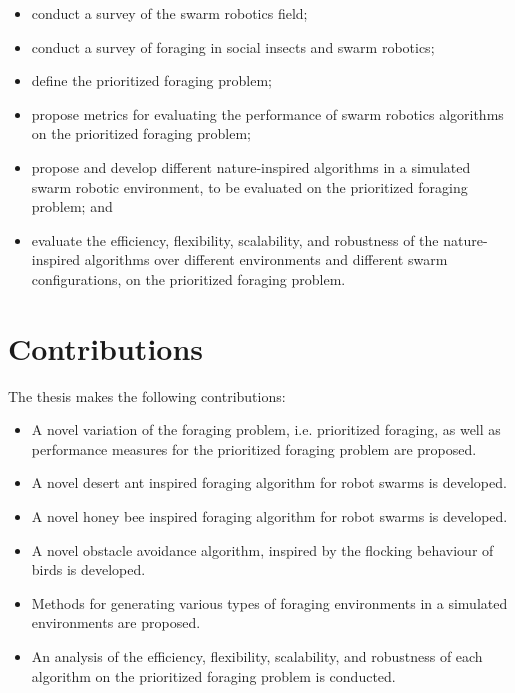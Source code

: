\begin{itemize}
	\item conduct a survey of the swarm robotics field;
	\item conduct a survey of foraging in social insects and  swarm robotics;
	\item define the prioritized foraging problem;
	\item propose metrics for evaluating the performance of swarm robotics algorithms on the prioritized foraging problem;
	\item propose and develop different nature-inspired algorithms in a simulated swarm robotic environment, to be evaluated on the prioritized foraging problem; and
	\item evaluate the efficiency, flexibility, scalability, and robustness of the nature-inspired algorithms over different environments and different swarm configurations, on the prioritized foraging problem.
\end{itemize}



\section{Contributions}
\label{sec:introduction:contributions}

The thesis makes the following contributions:

\begin{itemize}
	\item A novel variation of the foraging problem, i.e. prioritized foraging, as well as performance measures for the prioritized foraging problem are proposed.
	\item A novel desert ant inspired foraging algorithm for robot swarms is developed.
	\item A novel honey bee inspired foraging algorithm for robot swarms is developed.
	\item A novel obstacle avoidance algorithm, inspired by the flocking behaviour of birds is developed.
	\item Methods for generating various types of foraging environments in a simulated environments are proposed.
	\item An analysis of the efficiency, flexibility, scalability, and robustness of each algorithm on the prioritized foraging problem is conducted.
\end{itemize}


